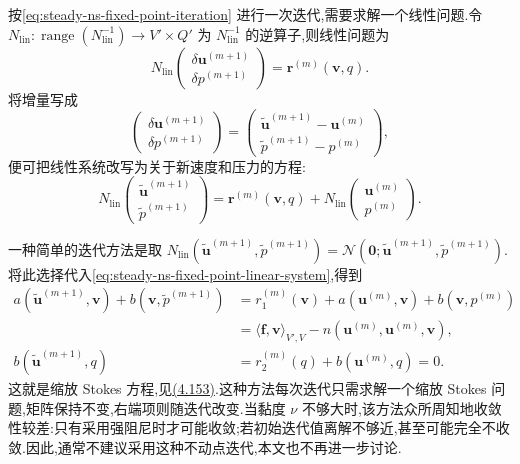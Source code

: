 \begin{note}[一般的不动点迭代]
按\cref{eq:steady-ns-fixed-point-iteration} 进行一次迭代,需要求解一个线性问题.令
$N_{\mathrm{lin}}:\operatorname{range}(N_{\mathrm{lin}}^{-1})\to V'\times Q'$
为 $N_{\mathrm{lin}}^{-1}$ 的逆算子,则线性问题为
\[
  N_{\mathrm{lin}}
  \begin{pmatrix}
    \delta\bm{u}^{(m+1)}\\ \delta p^{(m+1)}
  \end{pmatrix}
  =\bm{r}^{(m)}(\bm{v},q).
\]
将增量写成
\[
  \begin{pmatrix}
    \delta\bm{u}^{(m+1)}\\ \delta p^{(m+1)}
  \end{pmatrix}
  =
  \begin{pmatrix}
    \widetilde{\bm{u}}^{(m+1)}-\bm{u}^{(m)}\\
    \widetilde p^{(m+1)}-p^{(m)}
  \end{pmatrix},
\]
便可把线性系统改写为关于新速度和压力的方程:
\begin{equation}\label{eq:steady-ns-fixed-point-linear-system}
  N_{\mathrm{lin}}
  \begin{pmatrix}
    \widetilde{\bm{u}}^{(m+1)}\\ \widetilde p^{(m+1)}
  \end{pmatrix}
  =\bm{r}^{(m)}(\bm{v},q)
  +N_{\mathrm{lin}}
  \begin{pmatrix}
    \bm{u}^{(m)}\\p^{(m)}
  \end{pmatrix}.
\end{equation}
\end{note}

\begin{note}\label{note:steady-ns-scaled-stokes-iteration}
一种简单的迭代方法是取
$N_{\mathrm{lin}}(\widetilde{\bm{u}}^{(m+1)},\widetilde p^{(m+1)})
=\mathcal{N}(\bm{0};\widetilde{\bm{u}}^{(m+1)},\widetilde p^{(m+1)})$.
将此选择代入\cref{eq:steady-ns-fixed-point-linear-system},得到
\[
\begin{aligned}
  a(\widetilde{\bm{u}}^{(m+1)},\bm{v})
      +b(\bm{v},\widetilde p^{(m+1)})
   &=r_1^{(m)}(\bm{v})+a(\bm{u}^{(m)},\bm{v})
        +b(\bm{v},p^{(m)})\\
   &=\langle\bm{f},\bm{v}\rangle_{V',V}
        -n(\bm{u}^{(m)},\bm{u}^{(m)},\bm{v}),\\
  b(\widetilde{\bm{u}}^{(m+1)},q)
   &=r_2^{(m)}(q)+b(\bm{u}^{(m)},q)=0.
\end{aligned}
\]
这就是缩放 Stokes 方程,见\hyperref[eq:stokes-grad-div-scaled-weak]{(4.153)}.这种方法每次迭代只需求解一个缩放 Stokes 问题,矩阵保持不变,右端项则随迭代改变.当黏度 $\nu$ 不够大时,该方法众所周知地收敛性较差:只有采用强阻尼时才可能收敛;若初始迭代值离解不够近,甚至可能完全不收敛.因此,通常不建议采用这种不动点迭代,本文也不再进一步讨论.
\end{note}

